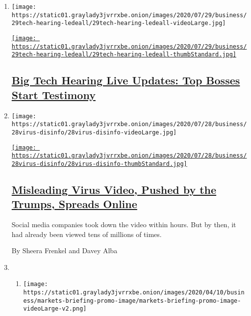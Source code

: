 \begin{enumerate}
\def\labelenumi{\arabic{enumi}.}
\item
  \texttt{[image: https://static01.graylady3jvrrxbe.onion/images/2020/07/29/business/29tech-hearing-ledeall/29tech-hearing-ledeall-videoLarge.jpg]}

  \href{https://www.nytimes3xbfgragh.onion/live/2020/07/29/technology/tech-ceos-hearing-testimony}{\texttt{[image: https://static01.graylady3jvrrxbe.onion/images/2020/07/29/business/29tech-hearing-ledeall/29tech-hearing-ledeall-thumbStandard.jpg]}}

  \hypertarget{big-tech-hearing-live-updates-top-bosses-start-testimony}{%
  \subsection{\texorpdfstring{\href{https://www.nytimes3xbfgragh.onion/live/2020/07/29/technology/tech-ceos-hearing-testimony}{Big
  Tech Hearing Live Updates: Top Bosses Start
  Testimony}}{Big Tech Hearing Live Updates: Top Bosses Start Testimony}}\label{big-tech-hearing-live-updates-top-bosses-start-testimony}}
\item
  \texttt{[image: https://static01.graylady3jvrrxbe.onion/images/2020/07/28/business/28virus-disinfo/28virus-disinfo-videoLarge.jpg]}

  \href{/2020/07/28/technology/virus-video-trump.html}{\texttt{[image: https://static01.graylady3jvrrxbe.onion/images/2020/07/28/business/28virus-disinfo/28virus-disinfo-thumbStandard.jpg]}}

  \hypertarget{misleading-virus-video-pushed-by-the-trumps-spreads-online}{%
  \subsection{\texorpdfstring{\href{/2020/07/28/technology/virus-video-trump.html}{Misleading
  Virus Video, Pushed by the Trumps, Spreads
  Online}}{Misleading Virus Video, Pushed by the Trumps, Spreads Online}}\label{misleading-virus-video-pushed-by-the-trumps-spreads-online}}

  Social media companies took down the video within hours. But by then,
  it had already been viewed tens of millions of times.

  By Sheera Frenkel and Davey Alba
\item
  \begin{enumerate}
  \def\labelenumii{\arabic{enumii}.}
  \item
    \texttt{[image: https://static01.graylady3jvrrxbe.onion/images/2020/04/10/business/markets-briefing-promo-image/markets-briefing-promo-image-videoLarge-v2.png]}


\end{enumerate}
\end{enumerate}
